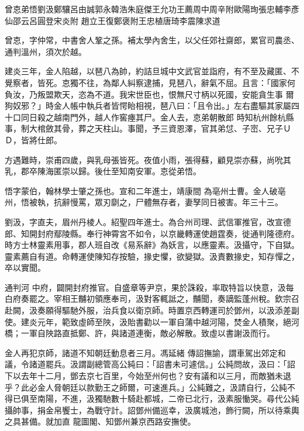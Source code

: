
\begin{pinyinscope}

 曾怘弟悟劉汲鄭驤呂由誠郭永韓浩朱庭傑王允功王薦周中周辛附歐陽珣張忠輔李彥仙邵云呂圓登宋炎附
 趙立王復鄭褒附王忠植唐琦李震陳求道



 曾怘，字仲常，中書舍人鞏之孫。補太學內舍生，以父任郊社齋郎，累官司農丞、通判溫州，須次於越。


建炎三年，金人陷越，以琶八為帥，約詰旦城中文武官並詣府，有不至及藏匿、不覺察者，皆死。怘獨不往，為鄰人糾察逮捕，見琶八，辭氣不屈。且言：「國家何負汝，乃叛盟欺天，恣為不道。我宋世臣也，恨無尺寸柄以死國，安能貪生事
 爾狗奴邪？」時金人帳中執兵者皆愕眙相視，琶八曰：「且令出。」左右盡驅其家屬四十口同日殺之越南門外，越人作窖瘞其尸。金人去，怘弟朝散郎
 時知杭州餘杭縣事，制大棺斂其骨，葬之天柱山。事聞，予三資恩澤，官其弟怤、子崈、兄子ＵＤ，皆將仕郎。



 方遇難時，崇甫四歲，與乳母張皆死。夜值小雨，張得蘇，顧見崇亦蘇，尚吮其乳，郡卒陳海匿崇以歸。後仕至知南安軍。怘從弟悟。



 悟字蒙伯，翰林學士肇之孫也。宣和二年進士，靖康間
 為亳州士曹。金人破亳州，悟被執，抗辭慢罵，眾刃劘之，尸體無存者，妻孥同日被害。年三十三。



 劉汲，字直夫，眉州丹棱人。紹聖四年進士。為合州司理、武信軍推官，改宣德郎、知開封府鄢陵縣。奉行神霄宮不如令，以京畿轉運使趙霆奏，徙通判隆德府。時方士林靈素用事，郡人班自改《易系辭》為妖言，以應靈素。汲攝守，下自獄。靈素薦自有道。命轉運使陳知存按驗，掾史懼，欲變獄。汲責數掾史，知存憚之，卒以實聞。



 通判河
 中府，闢開封府推官。自盛章等尹京，果於誅殺，率取特旨以快意，汲每白府奏罷之。宰相王黼初領應奉司，汲對客輒詆之，黼聞，奏謫監蓬州稅。欽宗召赴闕，汲奏願得驅馳外服，治兵食以衛京師。時置京西轉運司於鄧州，以汲添差副使。建炎元年，範致虛師至陜，汲貽書勸以一軍自蒲中越河陽，焚金人積聚，絕河橋；一軍自陜路直抵鄭、許，與諸道連衡，敵必解散。致虛以書謝汲而行。



 金人再犯京師，諸道不知朝廷動息者三月。馮延緒
 傳詔撫諭，謂車駕出郊定和議，令諸道罷兵。汲謂副總管高公純曰：「詔書未可遽信。」公純問故，汲曰：「詔下以去年十二月，鄧去京七百里，今始至州何也？安有議和以三月，而敵猶未退乎？此必金人脅朝廷以款勤王之師爾，可速進兵。」公純難之，汲請自行，公純不得已俱至南陽，不進，汲獨馳數十騎赴都城，二帝已北行，汲素服慟哭。尋代公純攝帥事，捐金帛饗士，為戰守計。詔鄧州備巡幸，汲廣城池，飾行闕，所以待乘輿之具甚備。就加直
 龍圖閣、知鄧州兼京西路安撫使。




\end{pinyinscope}

